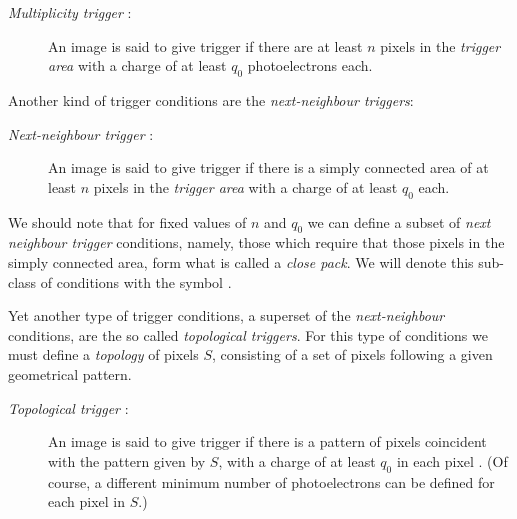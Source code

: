 \begin{description}
\item[\emph{Multiplicity trigger} :] An image is said
  to give trigger if there are at least $n$ pixels in the
  \emph{trigger area} with a charge of at least $q_0$ photoelectrons
  each.
\end{description}

\noindent
Another kind of trigger conditions are the \emph{next-neighbour
  triggers}:

\begin{description}
\item[\emph{Next-neighbour trigger} :] An image is said
  to give trigger if there is a simply connected area of at least
  $n$ pixels in the \emph{trigger area} with a charge of at least
  $q_0$ each.
\end{description}

\noindent 
We should note that for fixed values of $n$ and $q_0$ we can define a
subset of \emph{next neighbour trigger} conditions, namely, those
which require that those pixels in the simply connected area, form
what is called a \emph{close pack}. We will denote this sub-class
of conditions with the symbol .

\trigareafig

Yet another type of trigger conditions, a superset of the
\emph{next-neighbour} conditions, are the so called \emph{topological
  triggers}. For this type of conditions we must define a
\emph{topology} of pixels $S$, consisting of a set of pixels following
a given geometrical pattern.

\begin{description}
\item[\emph{Topological trigger} :] An image is said
  to give trigger if there is a pattern of pixels coincident with the
  pattern given by $S$, with a charge of at least $q_0$ in each pixel
  .  (Of course, a different minimum number of photoelectrons can be
  defined for each pixel in $S$.)
\end{description}

